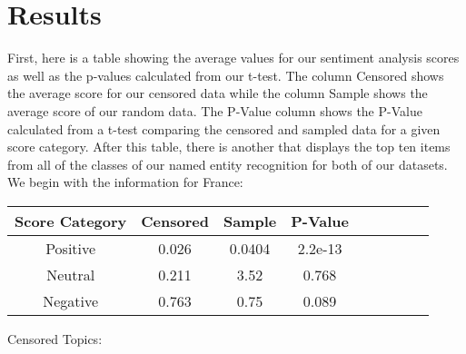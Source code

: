 \section{Results}\label{sec:results}
First, here is a table showing the average values for our sentiment analysis scores as well as the p-values calculated from our t-test. 
The column Censored shows the average score for our censored data while the column Sample shows the average score of our random data. The P-Value
column shows the P-Value calculated from a t-test comparing the censored and sampled data for a given score category.
After this table, there is another that displays the top ten items from all of the classes of our named entity recognition for both of our datasets.
We begin with the information for France:
\begin{center}
    \begin{tabular}{||c|c|c|c|c|c|c|c|c||} 
     \hline
     Score Category & Censored & Sample & P-Value \\ [0.5ex] 
     \hline\hline
     Positive & 0.026 & 0.0404 & 2.2e-13\\ 
     \hline
     Neutral & 0.211 & 3.52 & 0.768 \\
     \hline
     Negative & 0.763 & 0.75 & 0.089 \\
     \hline
    \end{tabular}
\end{center}

Censored Topics:
\begin{center}
\end{center}

